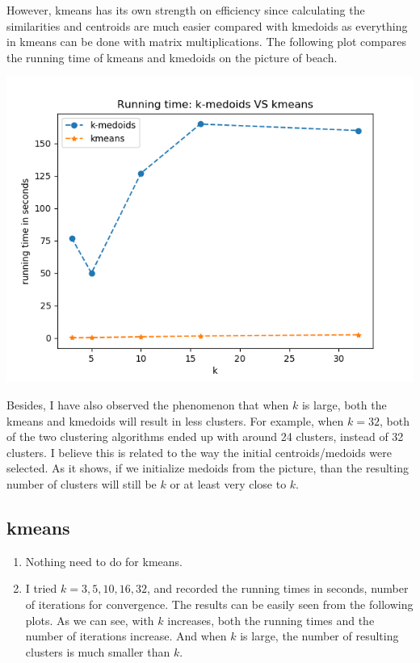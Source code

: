 \documentclass[twoside,10pt]{article}
\begin{document}
\begin{tcolorbox}
\begin{enumerate}
    However, kmeans has its own strength on efficiency since calculating the similarities and centroids are much easier compared with kmedoids as everything in kmeans can be done with matrix multiplications. The following plot compares the running time of kmeans and kmedoids on the picture of beach.
    \begin{center}
        \includegraphics[scale=.5]{images/run_time_compare.png}
    \end{center}
    
    Besides, I have also observed the phenomenon that when $k$ is large, both the kmeans and kmedoids will result in less clusters. For example, when $k = 32$, both of the two clustering algorithms ended up with around 24 clusters, instead of 32 clusters. I believe this is related to the way the initial centroids/medoids were selected. As it shows, if we initialize medoids from the picture, than the resulting number of clusters will still be $k$ or at least very close to $k$.

\end{enumerate}


\subsection{kmeans}
\begin{enumerate}
    \item Nothing need to do for kmeans.
    \item I tried $k = 3,5,10,16,32$, and recorded the running times in seconds, number of iterations for convergence. The results can be easily seen from the following plots. As we can see, with $k$ increases, both the running times and the number of iterations increase. And when $k$ is large, the number of resulting clusters is much smaller than $k$. 


\end{enumerate}
\end{tcolorbox}
\end{document}
